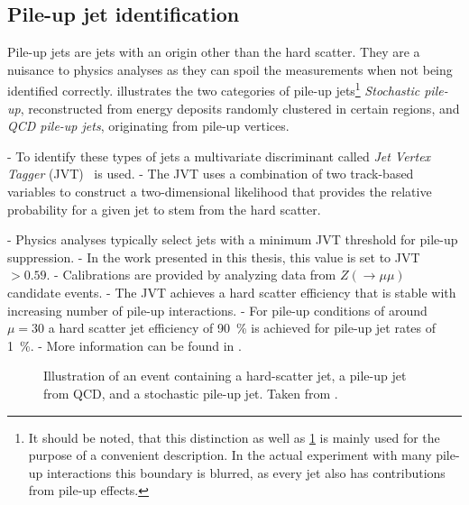 \subsection{Pile-up jet identification}
Pile-up jets are jets with an origin other than the hard scatter. They are a nuisance to physics analyses as they can spoil the measurements when not being identified correctly. 
 illustrates the two categories of pile-up jets\footnote{It should be noted, that this distinction as well as \cref{fig:pile-up-jets-illustration} is mainly used for the purpose of a convenient description. In the actual experiment with many pile-up interactions this boundary is blurred, as every jet also has contributions from pile-up effects.}
\emph{Stochastic pile-up}, reconstructed from energy deposits randomly clustered in certain regions, and \emph{QCD pile-up jets}, originating from pile-up vertices.


- To identify these types of jets a multivariate discriminant called \emph{Jet Vertex Tagger} (JVT)~\cite{ATLAS-CONF-2014-018} is used. 
- The JVT uses a combination of two track-based variables to construct a two-dimensional likelihood that provides the relative probability for a given jet to stem from the hard scatter. 

- Physics analyses typically select jets with a minimum JVT threshold for pile-up suppression.
- In the work presented in this thesis, this value is set to JVT $> 0.59$. 
- Calibrations are provided by analyzing data from $Z (\rightarrow \mu\mu)$ candidate events. 
- The JVT achieves a hard scatter efficiency that is stable with increasing number of pile-up interactions. 
- For pile-up conditions of around $\mu = 30$ a hard scatter jet efficiency of \SI{90}{\percent} is achieved for pile-up jet rates of \SI{1}{\percent}.
- More information can be found in .



\begin{figure}
    \caption{Illustration of an event containing a hard-scatter jet, a pile-up jet from QCD, and a stochastic pile-up jet. Taken from .}
    \label{fig:pile-up-jets-illustration}
\end{figure}

